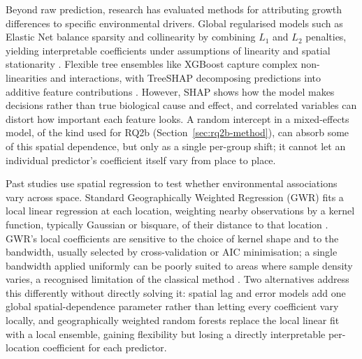 \documentclass[logo,msc,ai]{infthesis}           %
\begin{document}
Beyond raw prediction, research has evaluated methods for attributing growth differences to specific environmental drivers. Global regularised models such as Elastic Net balance sparsity and collinearity by combining $L_1$ and $L_2$ penalties, yielding interpretable coefficients under assumptions of linearity and spatial stationarity \cite{zou2005Regularization_C4_NN}. Flexible tree ensembles like XGBoost capture complex non-linearities and interactions, with TreeSHAP decomposing predictions into additive feature contributions \cite{chen2016XGBoost_C4_NN,lundberg2017Unified_C7_XAI}. However, SHAP shows how the model makes decisions rather than true biological cause and effect, and correlated variables can distort how important each feature looks. A random intercept in a mixed-effects model, of the kind used for RQ2b (Section~\ref{sec:rq2b-method}), can absorb some of this spatial dependence, but only as a single per-group shift; it cannot let an individual predictor's coefficient itself vary from place to place.

Past studies use spatial regression to test whether environmental associations vary across space. Standard Geographically Weighted Regression (GWR) fits a local linear regression at each location, weighting nearby observations by a kernel function, typically Gaussian or bisquare, of their distance to that location \cite{brunsdon1996Geographically_C6_GWR}. GWR's local coefficients are sensitive to the choice of kernel shape and to the bandwidth, usually selected by cross-validation or AIC minimisation; a single bandwidth applied uniformly can be poorly suited to areas where sample density varies, a recognised limitation of the classical method \cite{brunsdon1996Geographically_C6_GWR}. Two alternatives address this differently without directly solving it: spatial lag and error models add one global spatial-dependence parameter rather than letting every coefficient vary locally, and geographically weighted random forests replace the local linear fit with a local ensemble, gaining flexibility but losing a directly interpretable per-location coefficient for each predictor.
\end{document}
